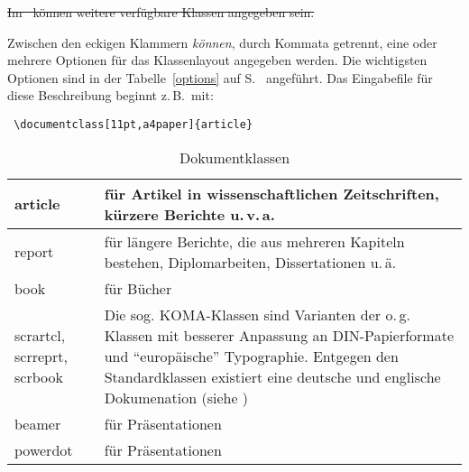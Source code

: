 \sout{Im \local\ können weitere verfügbare Klassen angegeben sein. }
 
Zwischen den eckigen Klammern \emph{können}, durch Kommata getrennt, eine oder 
mehrere Optionen für das Klassenlayout angegeben werden. Die wichtigsten 
Optionen sind in der Tabelle~\ref{options} auf S.~\pageref{options} angeführt.
Das Eingabefile für diese Beschreibung beginnt z.\,B.\ mit:
\begin{lstlisting}
 \documentclass[11pt,a4paper]{article}
\end{lstlisting}

\begin{table}[!hbpt]
\small
\caption{Dokumentklassen} \label{docstyles}
\centering
\renewcommand\arraystretch{1.5}
\begin{tabularx}{.95\linewidth}{@{}>{\raggedright\arraybackslash\ttfamily}p{2.2cm}X@{}}
\toprule
 article & für Artikel in wissenschaftlichen Zeitschriften,  kürzere Berichte u.\,v.\,a. \\\midrule
 report & für längere Berichte, die aus mehreren Kapiteln bestehen, Diplomarbeiten, Dissertationen u.\,ä. \\\midrule
 book   &  für Bücher \\\midrule
 scrartcl, scrreprt, scrbook & Die sog. KOMA-Klassen 
sind Varianten der o.\,g. Klassen mit besserer Anpassung an DIN-Papierformate und "`europäische"' Typographie. Entgegen den Standardklassen existiert eine deutsche und englische Dokumenation (siehe \cite{scrguide})\\\midrule
beamer & für Präsentationen \\\midrule
powerdot & für Präsentationen \\
 \bottomrule
\end{tabularx}

\end{table}

